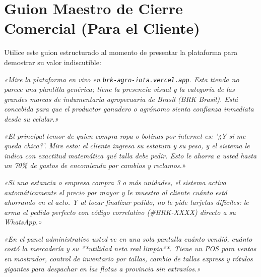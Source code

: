 \documentclass[11pt,a4paper]{article}
\begin{document}
\section{Guion Maestro de Cierre Comercial (Para el Cliente)}

Utilice este guion estructurado al momento de presentar la plataforma para demostrar su valor indiscutible:

\begin{tcolorbox}[colback=white,colframe=AgroGreen!80!black,title=\textbf{Paso 1: Demostrar Presencia y Nivel Gráfico (Minuto 1)}]
\textit{«Mire la plataforma en vivo en \texttt{brk-agro-iota.vercel.app}. Esta tienda no parece una plantilla genérica; tiene la presencia visual y la categoría de las grandes marcas de indumentaria agropecuaria de Brasil (BRK Brasil). Está concebida para que el productor ganadero o agrónomo sienta confianza inmediata desde su celular.»}
\end{tcolorbox}

\begin{tcolorbox}[colback=white,colframe=AgroGreen!80!black,title=\textbf{Paso 2: La Solución Definitiva a las Devoluciones (Minuto 2)}]
\textit{«El principal temor de quien compra ropa o botinas por internet es: '¿Y si me queda chica?'. Mire esto: el cliente ingresa su estatura y su peso, y el sistema le indica con exactitud matemática qué talla debe pedir. Esto le ahorra a usted hasta un 70\% de gastos de encomienda por cambios y reclamos.»}
\end{tcolorbox}

\begin{tcolorbox}[colback=white,colframe=AgroGreen!80!black,title=\textbf{Paso 3: Venta por Mayor y Cierre en WhatsApp (Minuto 3)}]
\textit{«Si una estancia o empresa compra 3 o más unidades, el sistema activa automáticamente el precio por mayor y le muestra al cliente cuánto está ahorrando en el acto. Y al tocar finalizar pedido, no le pide tarjetas difíciles: le arma el pedido perfecto con código correlativo (\#BRK-XXXX) directo a su WhatsApp.»}
\end{tcolorbox}

\begin{tcolorbox}[colback=white,colframe=AgroGreen!80!black,title=\textbf{Paso 4: El Control Financiero y Logístico en el ERP (Minuto 4)}]
\textit{«En el panel administrativo usted ve en una sola pantalla cuánto vendió, cuánto costó la mercadería y su **utilidad neta real limpia**. Tiene un POS para ventas en mostrador, control de inventario por tallas, cambio de tallas express y rótulos gigantes para despachar en las flotas a provincia sin extravíos.»}
\end{tcolorbox}
\end{document}
